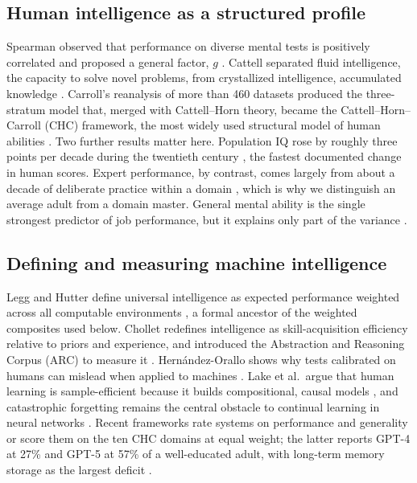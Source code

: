 \documentclass[11pt]{article}
\begin{document}
\subsection{Human intelligence as a structured profile}
Spearman observed that performance on diverse mental tests is positively correlated and proposed a general factor, $g$ \citep{spearman1904}. Cattell separated fluid intelligence, the capacity to solve novel problems, from crystallized intelligence, accumulated knowledge \citep{cattell1963}. Carroll's reanalysis of more than 460 datasets produced the three-stratum model that, merged with Cattell--Horn theory, became the Cattell--Horn--Carroll (CHC) framework, the most widely used structural model of human abilities \citep{carroll1993}. Two further results matter here. Population IQ rose by roughly three points per decade during the twentieth century \citep{flynn1987}, the fastest documented change in human scores. Expert performance, by contrast, comes largely from about a decade of deliberate practice within a domain \citep{ericsson1993}, which is why we distinguish an average adult from a domain master. General mental ability is the single strongest predictor of job performance, but it explains only part of the variance \citep{schmidt1998}.

\subsection{Defining and measuring machine intelligence}
Legg and Hutter define universal intelligence as expected performance weighted across all computable environments \citep{legg2007}, a formal ancestor of the weighted composites used below. Chollet redefines intelligence as skill-acquisition efficiency relative to priors and experience, and introduced the Abstraction and Reasoning Corpus (ARC) to measure it \citep{chollet2019}. Hern\'andez-Orallo shows why tests calibrated on humans can mislead when applied to machines \citep{hernandez2017}. Lake et al.\ argue that human learning is sample-efficient because it builds compositional, causal models \citep{lake2017}, and catastrophic forgetting remains the central obstacle to continual learning in neural networks \citep{kirkpatrick2017}. Recent frameworks rate systems on performance and generality \citep{morris2023} or score them on the ten CHC domains at equal weight; the latter reports GPT-4 at 27\% and GPT-5 at 57\% of a well-educated adult, with long-term memory storage as the largest deficit \citep{hendrycks2025}.
\end{document}
